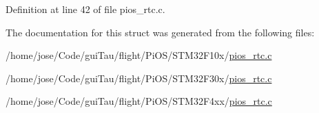 Definition at line 42 of file pios\-\_\-rtc.\-c.



The documentation for this struct was generated from the following files\-:\begin{DoxyCompactItemize}
\item 
/home/jose/\-Code/gui\-Tau/flight/\-Pi\-O\-S/\-S\-T\-M32\-F10x/\hyperlink{_s_t_m32_f10x_2pios__rtc_8c}{pios\-\_\-rtc.\-c}\item 
/home/jose/\-Code/gui\-Tau/flight/\-Pi\-O\-S/\-S\-T\-M32\-F30x/\hyperlink{_s_t_m32_f30x_2pios__rtc_8c}{pios\-\_\-rtc.\-c}\item 
/home/jose/\-Code/gui\-Tau/flight/\-Pi\-O\-S/\-S\-T\-M32\-F4xx/\hyperlink{_s_t_m32_f4xx_2pios__rtc_8c}{pios\-\_\-rtc.\-c}\end{DoxyCompactItemize}

